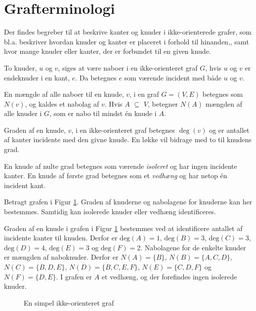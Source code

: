 \usetikzlibrary{arrows, positioning}
\section{Grafterminologi}

Der findes begreber til at beskrive kanter og knuder i ikke-orienterede grafer, som bl.a. beskriver hvordan knuder og kanter er placeret i forhold til hinanden,, samt hvor mange knuder eller kanter, der er forbundet til en given knude.

\begin{defn}
To knuder, $u$ og $v$, siges at være naboer i en ikke-orienteret graf $G$, hvis $u$ og $v$ er endeknuder i en kant, $e$. Da betegnes $e$ som værende incident med både $u$ og $v$.
\end{defn}

\begin{defn}
En mængde af alle naboer til en knude, $v$, i en graf $G=(V,E)$ betegnes som $N(v)$, og kaldes et nabolag af $v$. Hvis $A$ $\subseteq$ $V$, betegner $N(A)$ mængden af alle knuder i $G$, som er nabo til mindst én knude i $A$.
\end{defn}

\begin{defn}
Graden af en knude, $v$, i en ikke-orienteret graf betegnes $\deg(v)$ og er antallet af kanter incidente med den givne knude.  En løkke vil bidrage med to til knudens grad. 
\end{defn}

En knude af nulte grad betegnes som værende \textit{isoleret} og har ingen incidente kanter. En knude af første grad betegnes som et \textit{vedhæng} og har netop én incident kant.

\begin{exmp}
Betragt grafen i Figur \ref{eksempel_nabo}. Graden af knuderne og nabolagene for knuderne kan her bestemmes. Samtidig kan isolerede knuder eller vedhæng identificeres.

Graden af en knude i grafen i Figur \ref{eksempel_nabo} bestemmes ved at identificere antallet af incidente kanter til knuden. Derfor er $\textrm{deg}(A)=1$, $\textrm{deg}(B)=3$, $\textrm{deg}(C)=3$, $\textrm{deg}(D)=4$, $\textrm{deg}(E)=3$ og $\textrm{deg}(F)=2$. 
Nabolagene for de enkelte knuder er mængden af naboknuder. 
Derfor er $N(A)=\lbrace B \rbrace$, $N(B)=\lbrace A, C, D \rbrace$, $N(C)=\lbrace B, D, E \rbrace$, $N(D)=\lbrace B, C, E, F \rbrace$, $N(E)=\lbrace C, D, F \rbrace$ og $N(F)=\lbrace D, E \rbrace$. 
I grafen er $A$ et vedhæng, og der forefindes ingen isolerede knuder.

\begin{figure}[h!]
	\centering
	
	\caption{En simpel ikke-orienteret graf} \label{eksempel_nabo}
\end{figure}
\end{exmp}

